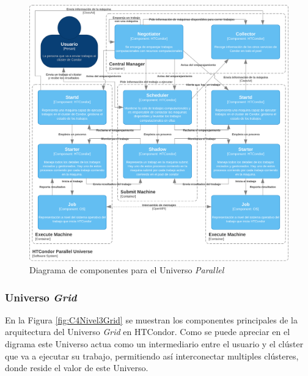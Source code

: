 \begin{figure}[H]
	\centering
	\includegraphics[scale=0.09]{tablas-images/C4/Diagramas HTCondor-Nivel 3 - Parallel.drawio.png}
	\caption{Diagrama de componentes para el Universo \textit{Parallel}}
    \label{fig:C4Nivel3Parallel}
\end{figure}

\subsubsection{Universo \textit{Grid}}
\noindent
En la Figura \ref{fig:C4Nivel3Grid} se muestran los componentes principales de la arquitectura del Universo \textit{Grid} en HTCondor. Como se puede apreciar en el digrama este Universo actua como un intermediario entre el usuario y el clúster que va a ejecutar su trabajo, permitiendo así interconectar multiples clústeres, donde reside el valor de este Universo.

